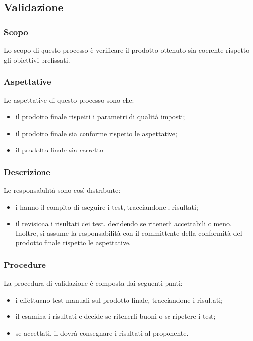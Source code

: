  \subsection{Validazione}
 \subsubsection{Scopo}
 Lo scopo di questo processo è verificare il prodotto ottenuto sia coerente rispetto gli obiettivi prefissati.
 \subsubsection{Aspettative}
 Le aspettative di questo processo sono che:
 \begin{itemize}
 	\item il prodotto finale rispetti i parametri di qualità imposti;
 	\item il prodotto finale sia conforme rispetto le aspettative;
 	\item il prodotto finale sia corretto.
 \end{itemize}
 \subsubsection{Descrizione}
 Le responsabilità sono così distribuite:
 \begin{itemize}
 	\item i \VERP{} hanno il compito di eseguire i test, tracciandone i risultati;
 	\item il \RESP{} revisiona i risultati dei test, decidendo se ritenerli accettabili o meno. Inoltre, si assume la responsabilità con il committente della conformità del prodotto finale rispetto le aspettative.
 \end{itemize}
 \subsubsection{Procedure}
 La procedura di validazione è composta dai seguenti punti:
 \begin{itemize}
 	\item i \VERP{} effettuano test manuali sul prodotto finale, tracciandone i risultati;
 	\item il \RESP{} esamina i risultati e decide se ritenerli buoni o se ripetere i test;
 	\item se accettati, il \RESP{} dovrà consegnare i risultati al proponente.
 \end{itemize}
 \newpage

